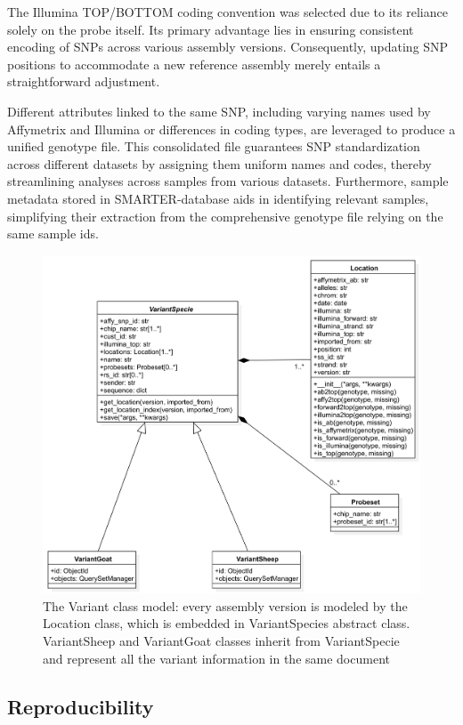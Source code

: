 \documentclass[a4paper,num-refs,gigabyte]{oup-contemporary}
\begin{document}
The Illumina TOP/BOTTOM coding convention was selected due to its reliance solely on the probe itself\citep{IlluminaTOP}. Its primary advantage lies in ensuring consistent encoding of SNPs across various assembly versions. Consequently, updating SNP positions to accommodate a new reference assembly merely entails a straightforward adjustment.

Different attributes linked to the same SNP, including varying names used by Affymetrix and Illumina or differences in coding types, are leveraged to produce a unified genotype file. This consolidated file guarantees SNP standardization across different datasets by assigning them uniform names and codes, thereby streamlining analyses across samples from various datasets. Furthermore, sample metadata stored in SMARTER-database aids in identifying relevant samples, simplifying their extraction from the comprehensive genotype file relying on the same sample ids.

\begin{figure}%
\centering
\includegraphics[width=.7\textwidth]{VariantModel.png}
\caption{The Variant class model: every assembly version is modeled by the Location class, which is embedded in VariantSpecies abstract class. VariantSheep and VariantGoat classes inherit from VariantSpecie and represent all the variant information in the same document}
\label{fig:variant_class_model}
\end{figure}

\subsection{Reproducibility}
\end{document}
